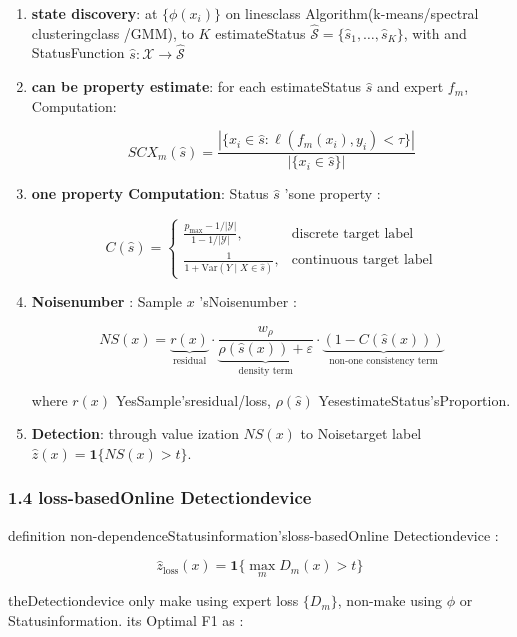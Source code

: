 \documentclass[
  12pt,
]{article}
\begin{document}
\begin{enumerate}
\def\labelenumi{\arabic{enumi}.}
\item
  \textbf{state discovery}: at  \(\{\phi(x_i)\}\)
  on linesclass Algorithm(k-means/spectral clusteringclass /GMM), to  \(K\) estimateStatus
  \(\hat{\mathcal{S}} = \{\hat{s}_1, \dots, \hat{s}_K\}\), with and StatusFunction
  \(\hat{s}: \mathcal{X} \to \hat{\mathcal{S}}\)
\item
  \textbf{can be property estimate}: for each estimateStatus \(\hat{s}\) and expert  \(f_m\), Computation: 

  \[SCX_m(\hat{s}) = \frac{|\{x_i \in \hat{s}: \ell(f_m(x_i), y_i) < \tau\}|}{|\{x_i \in \hat{s}\}|}\]
\item
  \textbf{one property Computation}: Status \(\hat{s}\) 'sone property : 

  \[C(\hat{s}) = \begin{cases}
  \frac{p_{\max} - 1/|\mathcal{Y}|}{1 - 1/|\mathcal{Y}|}, & \text{discrete target label}\\
  \frac{1}{1 + \text{Var}(Y \mid X \in \hat{s})}, & \text{continuous target label}
  \end{cases}\]
\item
  \textbf{Noisenumber }: Sample \(x\) 'sNoisenumber : 

  \[NS(x) = \underbrace{r(x)}_{\text{residual}} \cdot \underbrace{\frac{w_\rho}{\rho(\hat{s}(x)) + \varepsilon}}_{\text{density term}} \cdot \underbrace{(1 - C(\hat{s}(x)))}_{\text{non-one consistency term}}\]

  where \(r(x)\) YesSample'sresidual/loss, \(\rho(\hat{s})\) YesestimateStatus'sProportion. 
\item
  \textbf{Detection}: through value ization  \(NS(x)\) to Noisetarget label
  \(\hat{z}(x) = \mathbf{1}\{NS(x) > t\}\). 
\end{enumerate}

\subsubsection{1.4
loss-basedOnline Detectiondevice }\label{ux635fux5931ux57faux7ebfux68c0ux6d4bux5668}

definition non-dependenceStatusinformation'sloss-basedOnline Detectiondevice : 

\[\hat{z}_{\text{loss}}(x) = \mathbf{1}\{\max_m D_m(x) > t\}\]

theDetectiondevice only make using expert loss \(\{D_m\}\), non-make using  \(\phi\) or Statusinformation. its Optimal
F1 as : 
\end{document}
